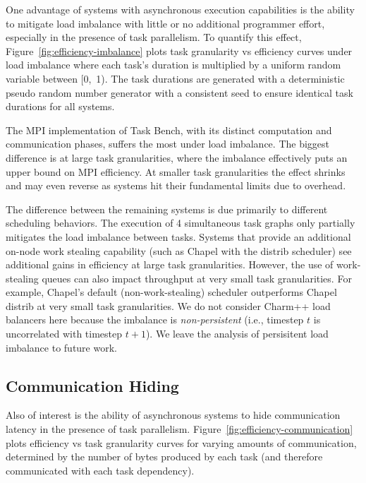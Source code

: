 


One advantage of systems with asynchronous execution capabilities is
the ability to mitigate load imbalance with little or no additional programmer effort, especially in the presence of
task parallelism. To quantify this effect,
Figure~\ref{fig:efficiency-imbalance} plots task granularity vs
efficiency curves under load imbalance where each task's duration is multiplied by a uniform random variable between [0,~1). The task durations are generated with a deterministic
pseudo random number generator with a consistent seed to ensure
identical task durations for all systems.

The MPI implementation of Task Bench, with its distinct computation and communication phases,
suffers the most under load imbalance. The biggest
difference is at large task granularities, where the imbalance
effectively puts an upper bound on MPI efficiency. At smaller task
granularities the effect shrinks and may even reverse as systems hit
their fundamental limits due to overhead.

The difference between the remaining systems is due primarily to
different scheduling behaviors. The execution of 4
simultaneous task graphs only partially mitigates the
load imbalance between tasks. Systems that provide an
additional on-node work stealing capability (such as Chapel with the distrib scheduler) see additional gains in
efficiency at large task granularities. However, the use of
work-stealing queues can also impact throughput at very small task
granularities. For example, Chapel's default (non-work-stealing) scheduler outperforms Chapel distrib at very small task granularities. We do not consider Charm++ load balancers here because the imbalance is \emph{non-persistent} (i.e., timestep $t$ is uncorrelated with timestep $t+1$). We leave the analysis of persisitent load imbalance to future work.

\subsection{Communication Hiding}

Also of interest is the ability of asynchronous systems to
hide communication latency in the presence of task
parallelism. Figure~\ref{fig:efficiency-communication} plots efficiency vs task
granularity curves for varying amounts of
communication, determined by the number
of bytes produced by each task (and therefore communicated with each
task dependency).

